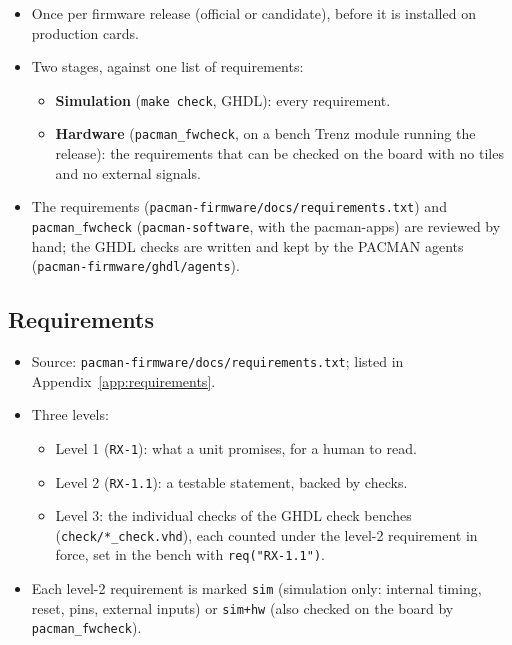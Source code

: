 \documentclass[11pt]{article}
\begin{document}
\begin{itemize}
\item Once per firmware release (official or candidate), before it is installed on production cards.
\item Two stages, against one list of requirements:
  \begin{itemize}
  \item \textbf{Simulation} (\texttt{make check}, GHDL): every requirement.
  \item \textbf{Hardware} (\texttt{pacman\_fwcheck}, on a bench Trenz module running the release): the
    requirements that can be checked on the board with no tiles and no external signals.
  \end{itemize}
\item The requirements (\texttt{pacman-firmware/docs/requirements.txt}) and \texttt{pacman\_fwcheck}
  (\texttt{pacman-software}, with the pacman-apps) are reviewed by hand;  the GHDL checks are written and kept by
  the PACMAN agents (\texttt{pacman-firmware/ghdl/agents}).
\end{itemize}

\subsection{Requirements}

\begin{itemize}
\item Source: \texttt{pacman-firmware/docs/requirements.txt}; listed in Appendix~\ref{app:requirements}.
\item Three levels:
  \begin{itemize}
  \item Level 1 (\texttt{RX-1}): what a unit promises, for a human to read.
  \item Level 2 (\texttt{RX-1.1}): a testable statement, backed by checks.
  \item Level 3: the individual checks of the GHDL check benches (\texttt{check/*\_check.vhd}), each counted under
    the level-2 requirement in force, set in the bench with \texttt{req("RX-1.1")}.
  \end{itemize}
\item Each level-2 requirement is marked \texttt{sim} (simulation only: internal timing, reset, pins, external
  inputs) or \texttt{sim+hw} (also checked on the board by \texttt{pacman\_fwcheck}).
\end{itemize}
\end{document}
